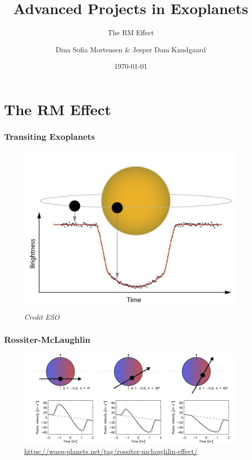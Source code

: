 \documentclass[notes]{beamer}
\title{Advanced Projects in Exoplanets}
\subtitle{The RM Effect}
\author{Dina Sofia Mortensen \& Jesper Dam Knudgaard}
\institute{Stellar Astrophysics Centre, Aarhus University}
\date{\today}
\begin{document}
\begin{frame}
\titlepage
\end{frame}

\section{The RM Effect}

\begin{frame}
\frametitle{Transiting Exoplanets}
	\begin{figure}
		\centering
		\includegraphics[width = 0.7\columnwidth]{Transit.jpg}
		\caption{\textit{Credit ESO}}
		\label{fig:transit} 
	\end{figure}
\end{frame}

\begin{frame}
\frametitle{Rossiter-McLaughlin}
	\begin{figure}
		\centering
		\includegraphics[width=\textwidth]{winnwhites.jpg}
		\caption{\url{https://wasp-planets.net/tag/rossiter-mclaughlin-effect/}}
		\label{fig:rm_effect}
	\end{figure}
\end{frame}
\end{document}
